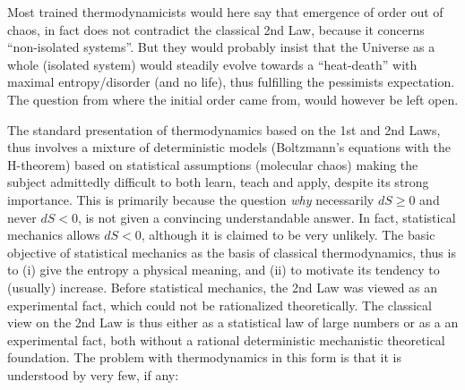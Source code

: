 
Most trained thermodynamicists would here say that emergence of order
out of chaos, in fact does not contradict the classical 2nd Law,
because it concerns ``non-isolated systems''. But they would probably
insist that the Universe as a whole (isolated system) would steadily
evolve towards a ``heat-death'' with maximal entropy/disorder (and no
life), thus fulfilling the pessimists expectation. The question from
where the initial order came from, would however be left open.

The standard presentation of thermodynamics based on the 1st and 2nd
Laws, thus involves a mixture of deterministic models (Boltzmann's
equations with the H-theorem) based on statistical assumptions
(molecular chaos) making the subject admittedly difficult to both
learn, teach and apply, despite its strong importance. This is
primarily because the question \emph{why} necessarily $dS\ge 0$ and
never $dS<0$, is not given a convincing understandable answer.  In
fact, statistical mechanics allows $dS<0$, although it is claimed to
be very unlikely. The basic objective of statistical mechanics as the
basis of classical thermodynamics, thus is to (i) give the entropy a
physical meaning, and (ii) to motivate its tendency to (usually)
increase. Before statistical mechanics, the 2nd Law was viewed as an
experimental fact, which could not be rationalized theoretically. The
classical view on the 2nd Law is thus either as a statistical law of
large numbers or as a an experimental fact, both without a rational
deterministic mechanistic theoretical foundation. The problem with
thermodynamics in this form is that it is understood by very few, if
any:

